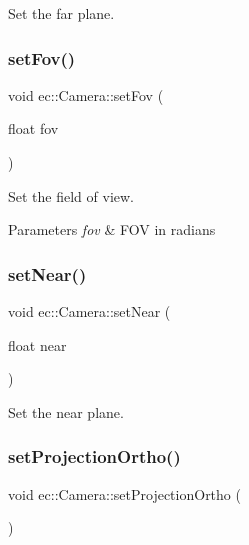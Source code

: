 Set the far plane. 

\mbox{\label{classec_1_1_camera_a1003feebe7df69a508f684c1c67f1388}} 
\subsubsection{\texorpdfstring{set\+Fov()}{setFov()}}
{\footnotesize\ttfamily void ec\+::\+Camera\+::set\+Fov (\begin{DoxyParamCaption}\item[{float}]{fov }\end{DoxyParamCaption})}



Set the field of view. 


\begin{DoxyParams}{Parameters}
{\em fov} & F\+OV in radians \\
\hline
\end{DoxyParams}
\mbox{\label{classec_1_1_camera_af0c1f82f4cb2aeb3908b858093080556}} 
\subsubsection{\texorpdfstring{set\+Near()}{setNear()}}
{\footnotesize\ttfamily void ec\+::\+Camera\+::set\+Near (\begin{DoxyParamCaption}\item[{float}]{near }\end{DoxyParamCaption})}



Set the near plane. 

\mbox{\label{classec_1_1_camera_ae36280401efe1d0f5bef9997952f8814}} 
\subsubsection{\texorpdfstring{set\+Projection\+Ortho()}{setProjectionOrtho()}}
{\footnotesize\ttfamily void ec\+::\+Camera\+::set\+Projection\+Ortho (\begin{DoxyParamCaption}{ }\end{DoxyParamCaption})}



